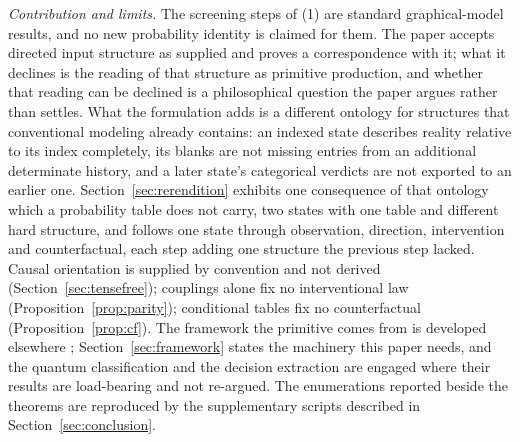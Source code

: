 \documentclass[11pt]{article}
\begin{document}
\noindent\textit{Contribution and limits.} The screening steps of (1) are standard graphical-model results, and no new probability identity is claimed for them. The paper accepts directed input structure as supplied and proves a correspondence with it; what it declines is the reading of that structure as primitive production, and whether that reading can be declined is a philosophical question the paper argues rather than settles. What the formulation adds is a different ontology for structures that conventional modeling already contains: an indexed state describes reality relative to its index completely, its blanks are not missing entries from an additional determinate history, and a later state's categorical verdicts are not exported to an earlier one. Section~\ref{sec:rerendition} exhibits one consequence of that ontology which a probability table does not carry, two states with one table and different hard structure, and follows one state through observation, direction, intervention and counterfactual, each step adding one structure the previous step lacked. Causal orientation is supplied by convention and not derived (Section~\ref{sec:tensefree}); couplings alone fix no interventional law (Proposition~\ref{prop:parity}); conditional tables fix no counterfactual (Proposition~\ref{prop:cf}). The framework the primitive comes from is developed elsewhere \cite{AethusBrief, Aethus}; Section~\ref{sec:framework} states the machinery this paper needs, and the quantum classification \cite{AethusQuant} and the decision extraction \cite{AethusDecision} are engaged where their results are load-bearing and not re-argued. The enumerations reported beside the theorems are reproduced by the supplementary scripts described in Section~\ref{sec:conclusion}.
\end{document}

